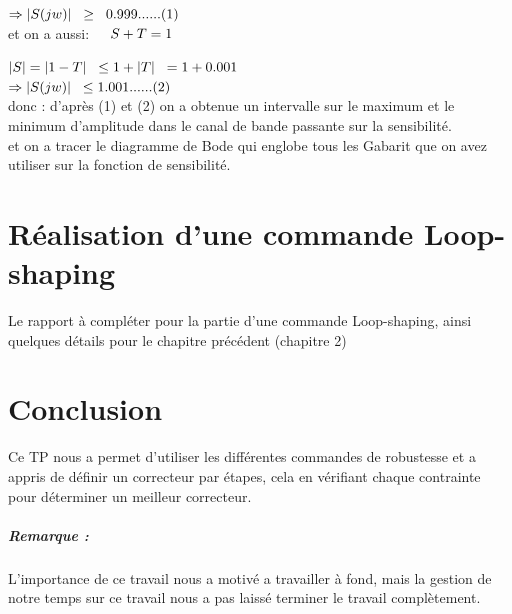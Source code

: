 \documentclass[12pt, a4paper, openany]{report}
\begin{document}
$\Rightarrow |S(jw)|\hspace{0.2cm}\geq\hspace{0.2cm}0.999 ......(1)$ \\

et on a aussi: $\hspace{0.2cm} \hspace{0.2cm} S+T=1 $ 

$ |S|=|1-T|\hspace{0.2cm} \leq 1 +|T|\hspace{0.2cm}=1+0.001 $\\

$\Rightarrow |S(jw)|\hspace{0.2cm}\leq 1.001 ......(2) $ \\

donc : d'après (1) et (2) on a obtenue un intervalle sur le maximum et le minimum d'amplitude dans le canal de bande passante sur la sensibilité. \\

et on a tracer le diagramme de Bode qui englobe tous les Gabarit que on avez utiliser sur la fonction de sensibilité.   



\chapter{Réalisation d'une commande Loop-shaping }
 
 Le rapport à compléter pour la partie d'une commande Loop-shaping, ainsi quelques détails pour le chapitre précédent (chapitre 2)   


\chapter*{Conclusion}

Ce TP nous a permet d'utiliser les différentes commandes de robustesse et a appris de définir un correcteur par étapes, cela en vérifiant chaque contrainte pour déterminer un meilleur correcteur.\\

\paragraph{Remarque :}
 L’importance de ce travail nous a motivé a travailler à fond, mais la gestion de notre temps sur ce travail nous a pas laissé terminer le travail complètement.








 







%
%
\end{document}
